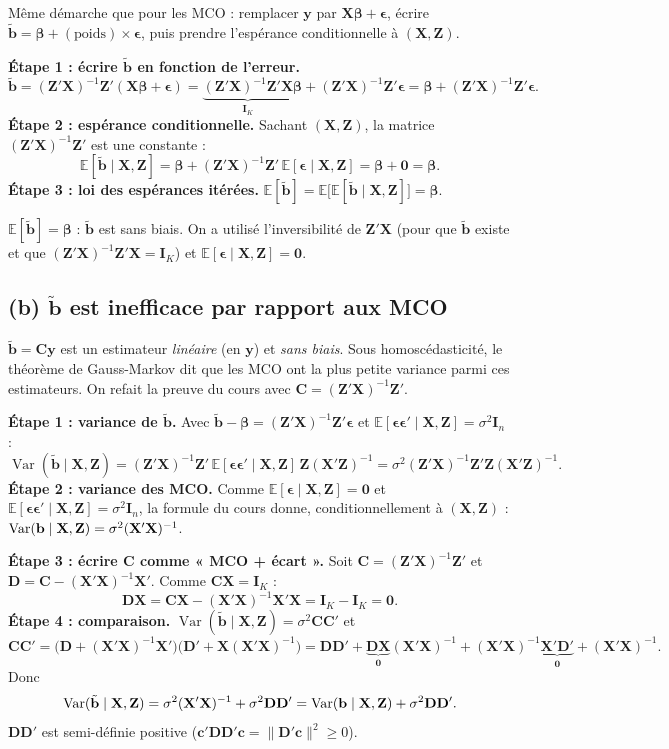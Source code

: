 \documentclass[11pt,a4paper]{article}
\newcommand{\vy}{\mathbf{y}}\newcommand{\vX}{\mathbf{X}}\newcommand{\vZ}{\mathbf{Z}}
\newcommand{\vbeta}{\bm{\beta}}\newcommand{\veps}{\bm{\epsilon}}\newcommand{\vi}{\bm{\iota}}
\newcommand{\I}{\mathbf{I}}\newcommand{\C}{\mathbf{C}}\newcommand{\D}{\mathbf{D}}
\newcommand{\tb}{\tilde{\mathbf{b}}}
\newcommand{\E}{\mathbb{E}}\newcommand{\Var}{\operatorname{Var}}\newcommand{\Cov}{\operatorname{Cov}}
\begin{document}
\begin{idee}
Même démarche que pour les MCO : remplacer $\vy$ par $\vX\vbeta+\veps$, écrire $\tb=\vbeta+(\text{poids})\times\veps$, puis prendre l'espérance conditionnelle à $(\vX,\vZ)$.
\end{idee}

\textbf{Étape 1 : écrire $\tb$ en fonction de l'erreur.}
\[
\tb=(\vZ'\vX)^{-1}\vZ'(\vX\vbeta+\veps)=\underbrace{(\vZ'\vX)^{-1}\vZ'\vX}_{\I_K}\vbeta+(\vZ'\vX)^{-1}\vZ'\veps=\vbeta+(\vZ'\vX)^{-1}\vZ'\veps .
\]
\textbf{Étape 2 : espérance conditionnelle.} Sachant $(\vX,\vZ)$, la matrice $(\vZ'\vX)^{-1}\vZ'$ est une constante :
\[
\E[\tb\mid\vX,\vZ]=\vbeta+(\vZ'\vX)^{-1}\vZ'\,\E[\veps\mid\vX,\vZ]=\vbeta+\mathbf 0=\vbeta .
\]
\textbf{Étape 3 : loi des espérances itérées.} $\E[\tb]=\E\big[\E[\tb\mid\vX,\vZ]\big]=\vbeta$.

\begin{reponse}
$\E[\tb]=\vbeta$ : $\tb$ est sans biais. On a utilisé l'inversibilité de $\vZ'\vX$ (pour que $\tb$ existe et que $(\vZ'\vX)^{-1}\vZ'\vX=\I_K$) et $\E[\veps\mid\vX,\vZ]=\mathbf 0$.
\end{reponse}

\subsection*{(b) $\tb$ est inefficace par rapport aux MCO}

\begin{idee}
$\tb=\C\vy$ est un estimateur \emph{linéaire} (en $\vy$) et \emph{sans biais}. Sous homoscédasticité, le théorème de Gauss-Markov dit que les MCO ont la plus petite variance parmi ces estimateurs. On refait la preuve du cours avec $\C=(\vZ'\vX)^{-1}\vZ'$.
\end{idee}

\textbf{Étape 1 : variance de $\tb$.} Avec $\tb-\vbeta=(\vZ'\vX)^{-1}\vZ'\veps$ et $\E[\veps\veps'\mid\vX,\vZ]=\sigma^2\I_n$ :
\[
\Var(\tb\mid\vX,\vZ)=(\vZ'\vX)^{-1}\vZ'\,\E[\veps\veps'\mid\vX,\vZ]\,\vZ(\vX'\vZ)^{-1}=\sigma^2(\vZ'\vX)^{-1}\vZ'\vZ(\vX'\vZ)^{-1}.
\]
\textbf{Étape 2 : variance des MCO.} Comme $\E[\veps\mid\vX,\vZ]=\mathbf 0$ et $\E[\veps\veps'\mid\vX,\vZ]=\sigma^2\I_n$, la formule du cours donne, conditionnellement à $(\vX,\vZ)$ : $\Var(\vb\mid\vX,\vZ)=\sigma^2(\vX'\vX)^{-1}$.

\textbf{Étape 3 : écrire $\C$ comme « MCO + écart ».} Soit $\C=(\vZ'\vX)^{-1}\vZ'$ et $\D=\C-(\vX'\vX)^{-1}\vX'$. Comme $\C\vX=\I_K$ :
\[
\D\vX=\C\vX-(\vX'\vX)^{-1}\vX'\vX=\I_K-\I_K=\mathbf 0 .
\]
\textbf{Étape 4 : comparaison.} $\Var(\tb\mid\vX,\vZ)=\sigma^2\C\C'$ et
\[
\C\C'=\big(\D+(\vX'\vX)^{-1}\vX'\big)\big(\D'+\vX(\vX'\vX)^{-1}\big)
=\D\D'+\underbrace{\D\vX}_{\mathbf 0}(\vX'\vX)^{-1}+(\vX'\vX)^{-1}\underbrace{\vX'\D'}_{\mathbf 0}+(\vX'\vX)^{-1}.
\]
Donc
\[
\Var(\tb\mid\vX,\vZ)=\sigma^2(\vX'\vX)^{-1}+\sigma^2\D\D'=\Var(\vb\mid\vX,\vZ)+\sigma^2\D\D' .
\]
$\D\D'$ est semi-définie positive ($\mathbf c'\D\D'\mathbf c=\|\D'\mathbf c\|^2\ge0$).
\end{document}
